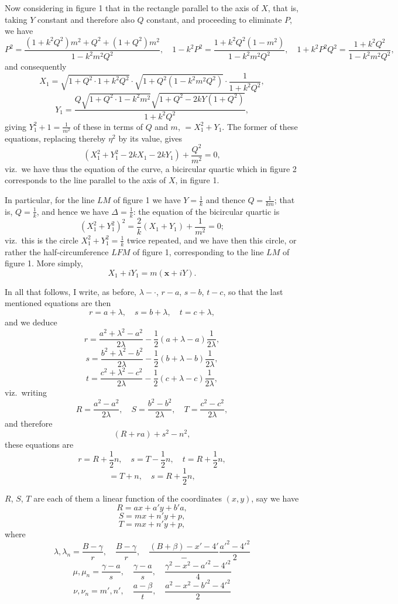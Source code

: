 \documentclass[11pt,a4paper]{book}
\begin{document}
Now considering in figure 1 that in the rectangle parallel to the axis of $X$, that is, taking $Y$ constant and therefore also $Q$ constant, and proceeding to eliminate $P$, we have
\[
P^2 = \frac{(1 + k^2 Q^2)m^2 + Q^2 + (1 + Q^2)m^2}{1 - k^2 m^2 Q^2}, \quad 1 - k^2 P^2 = \frac{1 + k^2 Q^2(1 - m^2)}{1 - k^2 m^2 Q^2}, \quad 1 + k^2 P^2 Q^2 = \frac{1 + k^2 Q^2}{1 - k^2 m^2 Q^2},
\]
and consequently
\[
X_1 = \sqrt{1 + Q^2 \cdot 1 + k^2 Q^2} \cdot \sqrt{1 + Q^2 (1 - k^2 m^2 Q^2)} \cdot \frac{1}{1 + k^2 Q^2},
\]
\[
Y_1 = \frac{Q \sqrt{1 + Q^2 \cdot 1 - k^2 m^2}\sqrt{1 + Q^2 - 2k Y(1 + Q^2)}}{1 + k^2 Q^2},
\]
giving $Y_1^2 + 1 = \frac{1}{m^2}$ of these in terms of $Q$ and $m$, $= X_1^2 + Y_1$. The former of these equations, replacing thereby $\eta^2$ by its value, gives
\[
(X_1^2 + Y_1^2 - 2k X_1 - 2k Y_1) + \frac{Q^2}{m^2} = 0,
\]
viz.\ we have thus the equation of the curve, a bicircular quartic which in figure 2 corresponds to the line parallel to the axis of $X$, in figure 1.

In particular, for the line $LM$ of figure 1 we have $Y = \frac{1}{k}$ and thence $Q = \frac{1}{km}$; that is, $Q = \frac{1}{k}$, and hence we have $\Delta = \frac{1}{k}$: the equation of the bicircular quartic is
\[
(X_1^2 + Y_1^2)^2 = \frac{2}{k} (X_1 + Y_1) + \frac{1}{m^2} = 0;
\]
viz.\ this is the circle $X_1^2 + Y_1^2 = \frac{1}{k}$ twice repeated, and we have then this circle, or rather the half-circumference $LFM$ of figure 1, corresponding to the line $LM$ of figure 1. More simply,
\[
X_1 + iY_1 = m(\boldsymbol{x} + iY).
\]

In all that follows, I write, as before, $\lambda - \cdot$, $r - a$, $s - b$, $t - c$, so that the last mentioned equations are then
\[
r = a + \lambda, \quad s = b + \lambda, \quad t = c + \lambda,
\]
and we deduce
\[
r = \frac{a^2 + \lambda^2 - a^2}{2\lambda} - \frac{1}{2}(a + \lambda - a)\frac{1}{2\lambda},
\]
\[
s = \frac{b^2 + \lambda^2 - b^2}{2\lambda} - \frac{1}{2}(b + \lambda - b)\frac{1}{2\lambda},
\]
\[
t = \frac{c^2 + \lambda^2 - c^2}{2\lambda} - \frac{1}{2}(c + \lambda - c)\frac{1}{2\lambda},
\]
viz.\ writing
\[
R = \frac{a^2 - a^2}{2\lambda}, \quad S = \frac{b^2 - b^2}{2\lambda}, \quad T = \frac{c^2 - c^2}{2\lambda},
\]
and therefore
\[
(R + ra) + s^2 - n^2,
\]
these equations are
\[
r = R + \frac{1}{2}n, \quad s = T - \frac{1}{2}n, \quad t = R + \frac{1}{2}n,
\]
\[
= T + n, \quad s = R + \frac{1}{2}n,
\]

$R$, $S$, $T$ are each of them a linear function of the coordinates $(x, y)$, say we have
\[
R = ax + a'y + b'a,
\]
\[
S = mx + n'y + p,
\]
\[
T = mx + n'y + p,
\]
where
\[
\lambda, \lambda_n = \frac{B - \gamma}{r}, \quad \frac{B - \gamma}{r}, \quad \frac{(B + \beta) - x' - 4'} - \frac{a'^2 - 4'^2}{2}
\]
\[
\mu, \mu_n = \frac{\gamma - a}{s}, \quad \frac{\gamma - a}{s}, \quad \frac{\gamma^2 - x^2 - a'^2 - 4'^2}{4}
\]
\[
\nu, \nu_n = m', n', \quad \frac{a - \beta}{t}, \quad \frac{a^2 - x^2 - b'^2 - 4'^2}{2}
\]
\end{document}
